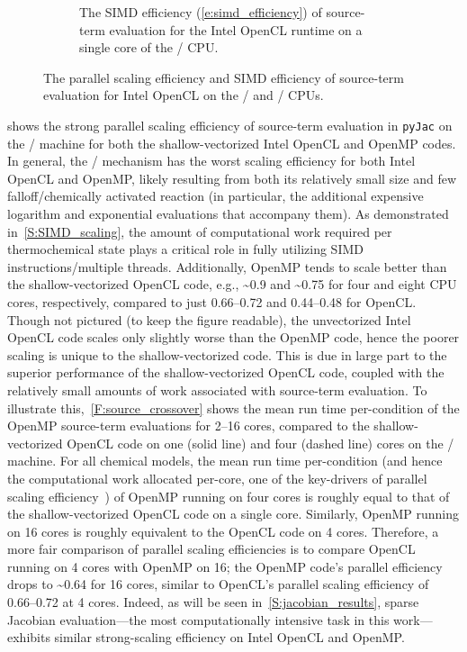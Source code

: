\documentclass[12pt,number,sort&compress,preprint]{elsarticle}
\begin{document}
\begin{figure}[htbp]
\begin{subfigure}[t]{0.48\linewidth}
      \caption{The SIMD efficiency (\cref{e:simd_efficiency}) of source-term evaluation for the Intel OpenCL runtime on a single core of the \sse/ CPU.}
      \label{F:source_sse_simd_scaling}
  \end{subfigure}
  \caption{The parallel scaling efficiency and SIMD efficiency of source-term evaluation for Intel OpenCL on the \avx/ and \sse/ CPUs.}
  \label{F:source_scaling}
\end{figure}

 shows the strong parallel scaling efficiency of source-term evaluation in \texttt{pyJac} on the \avx/ machine for both the shallow-vectorized Intel OpenCL and OpenMP codes.
In general, the \slash{} mechanism has the worst scaling efficiency for both Intel OpenCL and OpenMP, likely resulting from both its relatively small size and few falloff\slash chemically activated reaction (in particular, the additional expensive logarithm and exponential evaluations that accompany them).
As demonstrated in~\cref{S:SIMD_scaling}, the amount of computational work required per thermochemical state plays a critical role in fully utilizing SIMD instructions\slash multiple threads.
Additionally, OpenMP tends to scale better than the shallow-vectorized OpenCL code, e.g., \textasciitilde\num{0.9} and \textasciitilde\num{0.75} for four and eight CPU cores, respectively, compared to just \numrange{0.66}{0.72} and \numrange{0.44}{0.48} for OpenCL.
Though not pictured (to keep the figure readable), the unvectorized Intel OpenCL code scales only slightly worse than the OpenMP code, hence the poorer scaling is unique to the shallow-vectorized code.
This is due in large part to the superior performance of the shallow-vectorized OpenCL code, coupled with the relatively small amounts of work associated with source-term evaluation.
To illustrate this,~\cref{F:source_crossover} shows the mean run time per-condition of the OpenMP source-term evaluations for \numrange{2}{16} cores, compared to the shallow-vectorized OpenCL code on one (solid line) and four (dashed line) cores on the \avx/ machine.
For all chemical models, the mean run time per-condition (and hence the computational work allocated per-core, one of the key-drivers of parallel scaling efficiency~\cite{strong_scaling}) of OpenMP running on four cores is roughly equal to that of the shallow-vectorized OpenCL code on a single core.
Similarly, OpenMP running on \num{16} cores is roughly equivalent to the OpenCL code on \num{4} cores.
Therefore, a more fair comparison of parallel scaling efficiencies is to compare OpenCL running on \num{4} cores with OpenMP on \num{16}; the OpenMP code's parallel efficiency drops to \textasciitilde\num{0.64} for \num{16} cores, similar to OpenCL's parallel scaling efficiency of \numrange{0.66}{0.72} at \num{4} cores.
Indeed, as will be seen in~\cref{S:jacobian_results}, sparse Jacobian evaluation---the most computationally intensive task in this work---exhibits similar strong-scaling efficiency on Intel OpenCL and OpenMP.
\end{document}
